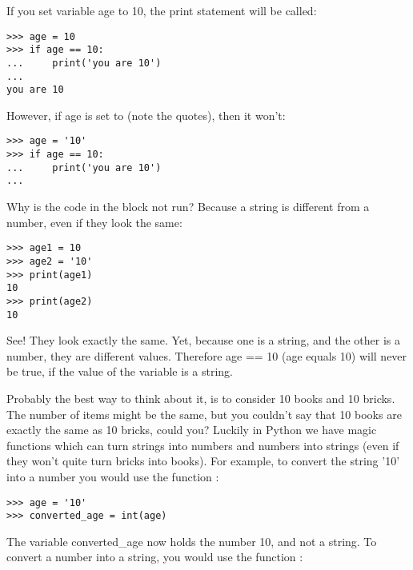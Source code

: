 If you set variable age to 10, the print statement will be called:

\begin{listing}
\begin{verbatim}
>>> age = 10
>>> if age == 10:
...     print('you are 10')
...
you are 10
\end{verbatim}
\end{listing}

However, if age is set to  (note the quotes), then it won't:

\begin{listing}
\begin{verbatim}
>>> age = '10'
>>> if age == 10:
...     print('you are 10')
...
\end{verbatim}
\end{listing}

Why is the code in the block not run?  Because a string is different from a number, even if they look the same:

\begin{listing}
\begin{verbatim}
>>> age1 = 10
>>> age2 = '10'
>>> print(age1)
10
>>> print(age2)
10
\end{verbatim}
\end{listing}

See!  They look exactly the same.  Yet, because one is a string, and the other is a number, they are different values. Therefore age == 10 (age equals 10) will never be true, if the value of the variable is a string.
\par
Probably the best way to think about it, is to consider 10 books and 10 bricks.  The number of items might be the same, but you couldn't say that 10 books are exactly the same as 10 bricks, could you? Luckily in Python we have magic functions which can turn strings into numbers and numbers into strings (even if they won't quite turn bricks into books). For example, to convert the string '10' into a number you would use the function :

\begin{listing}
\begin{verbatim}
>>> age = '10'
>>> converted_age = int(age)
\end{verbatim}
\end{listing}

\noindent
The variable converted\_age now holds the number 10, and not a string. To convert a number into a string, you would use the function :

